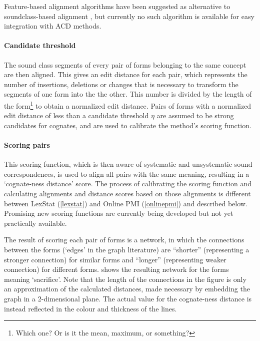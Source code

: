 \documentclass[a4paper,11pt,twocolumn]{scrartcl}
\begin{document}
Feature-based alignment algorithms have been suggested as alternative to
soundclass-based alignment \parencite{faal}, but currently no such algorithm is
available for easy integration with ACD methods.

\paragraph{Candidate threshold}
\label{candidate}
The sound class segments of every pair of forms belonging to the same concept
are then aligned. This gives an edit distance for each pair, which represents
the number of insertions, deletions or changes that is necessary to transform
the segments of one form into the the other. This number is divided by the
length of the form\footnote{Which one? Or is it the mean, maximum, or
  something?} to obtain a normalized edit distance. Pairs of forms with a
normalized edit distance of less than a candidate threshold $η$ are assumed to
be strong candidates for cognates, and are used to calibrate the method's
scoring function.

\paragraph{Scoring pairs}
This scoring function, which is then aware of systematic and unsystematic sound
correspondences, is used to align all pairs with the same meaning, resulting in
a ‘cognate-ness distance’ score. The process of calibrating the scoring function
and calculating alignments and distance scores based on those alignments is
different between LexStat (\cref{lexstat}) and Online PMI (\cref{onlinepmi}) and
described below. Promising new scoring functions are currently being developed
\parencite{jager2016automatic,jager2017using} but not yet practically available.

The result of scoring each pair of forms is a network, in which the connections
between the forms (‘edges’ in the graph literature) are “shorter” (representing
a stronger connection) for similar forms and “longer” (representing weaker
connection) for different forms.  shows the resulting
network for the forms meaning ‘sacrifice’. Note that the length of the
connections in the figure is only an approximation of the calculated distances,
made necessary by embedding the graph in a 2-dimensional plane. The actual value
for the cognate-ness distance is instead reflected in the colour and thickness
of the lines.
\end{document}
